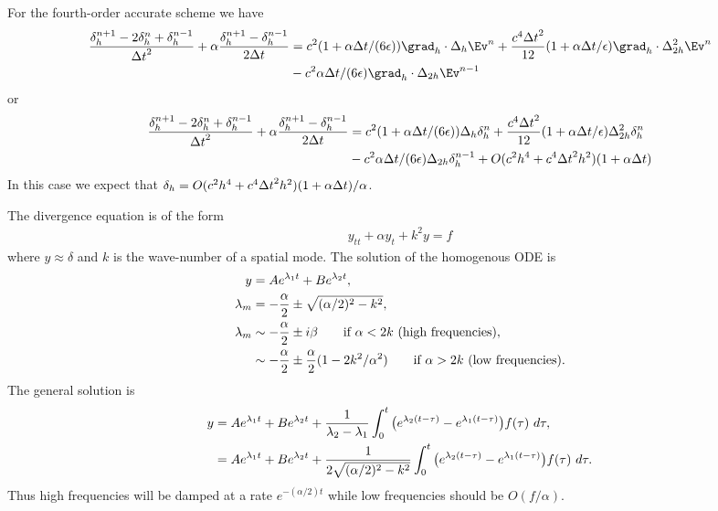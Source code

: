 For the fourth-order accurate scheme we have
\begin{align*}
{\delta_{h}^{n+1} - 2\delta_{h}^{n} + \delta_{h}^{n-1} \over \dt^2 }
  + \alpha {\delta_{h}^{n+1} -  \delta_{h}^{n-1} \over 2 \dt } &= 
                c^2(1 +\alpha\dt/(6\epsilon))\grad_{h}\cdot\Delta_{h} \Ev^{n} 
                + {c^4 \dt^2 \over 12}(1 +\alpha\dt/\epsilon)\grad_{h}\cdot\Delta_{2h}^2 \Ev^{n} \\
                &- c^2 \alpha\dt/(6\epsilon) \grad_{h}\cdot\Delta_{2h}\Ev^{n-1}
\end{align*}
or 
\begin{align*}
{\delta_{h}^{n+1} - 2\delta_{h}^{n} + \delta_{h}^{n-1} \over {\Delta t}^2 }
  + \alpha {\delta_{h}^{n+1} -  \delta_{h}^{n-1} \over 2 {\Delta t}} &= 
                c^2(1 +\alpha{\Delta t}/(6\epsilon))\Delta_{h} \delta_h^{n} 
                + {c^4 {\Delta t}^2 \over 12}(1 +\alpha{\Delta t}/\epsilon)\Delta_{2h}^2 \delta_h^{n} \\
                &- c^2 \alpha{\Delta t}/(6\epsilon) \Delta_{2h}\delta_h^{n-1} + O( c^2 h^4+ c^4 {\Delta t}^2 h^2) (1+\alpha{\Delta t})
\end{align*}
In this case we expect that $\delta_{h} = O( c^2 h^4+ c^4 {\Delta t}^2 h^2) (1+\alpha{\Delta t})/\alpha$. 


The divergence equation is of the form
\begin{align*}
  y_{tt} + \alpha y_t + k^2 y =  f 
\end{align*}
where $y \approx \delta$ and $k$ is the wave-number of a spatial mode. The solution of the homogenous ODE is
\begin{align*}
  y &= A e^{\lambda_1 t } + B e^{\lambda_2 t } , \\
  \lambda_m &= -{\alpha\over2} \pm \sqrt{ (\alpha/2)^2 - k^2} , \\
  \lambda_m & \sim -{\alpha\over2} \pm i \beta \qquad\text{if $\alpha < 2k$ (high frequencies)} , \\
            & \sim -{\alpha\over2} \pm {\alpha\over2}(1-2k^2/\alpha^2) \qquad\text{if $\alpha > 2k$ (low frequencies)} .
\end{align*}
The general solution is 
\begin{align*}
  y &=  A e^{\lambda_1 t } + B e^{\lambda_2 t } 
         + {1\over \lambda_2 -\lambda_1} \int_0^t \big( e^{\lambda_2(t-\tau)} - e^{\lambda_1(t-\tau)} \big) f(\tau) ~d\tau, \\
    &= A e^{\lambda_1 t } + B e^{\lambda_2 t } 
         + {1\over 2\sqrt{ (\alpha/2)^2 - k^2}} \int_0^t \big( e^{\lambda_2(t-\tau)} - e^{\lambda_1(t-\tau)} \big) f(\tau) ~d\tau.
\end{align*}
Thus high frequencies will be damped at a rate $e^{-(\alpha/2) t }$ while low frequencies should be $O(f/\alpha)$.
